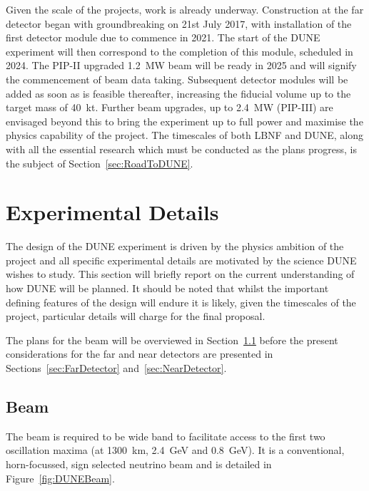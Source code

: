 Given the scale of the projects, work is already underway.  Construction at the far detector began with groundbreaking on 21st July 2017, with installation of the first detector module due to commence in 2021.  The start of the DUNE experiment will then correspond to the completion of this module, scheduled in 2024.  The PIP-II upgraded 1.2~MW beam will be ready in 2025 and will signify the commencement of beam data taking.  Subsequent detector modules will be added as soon as is feasible thereafter, increasing the fiducial volume up to the target mass of 40~kt.  Further beam upgrades, up to 2.4~MW (PIP-III) are envisaged beyond this to bring the experiment up to full power and maximise the physics capability of the project.  The timescales of both LBNF and DUNE, along with all the essential research which must be conducted as the plans progress, is the subject of Section~\ref{sec:RoadToDUNE}.

\section{Experimental Details}\label{sec:DUNEExperiment}

The design of the DUNE experiment is driven by the physics ambition of the project and all specific experimental details are motivated by the science DUNE wishes to study.  This section will briefly report on the current understanding of how DUNE will be planned.  It should be noted that whilst the important defining features of the design will endure it is likely, given the timescales of the project, particular details will charge for the final proposal.

The plans for the beam will be overviewed in Section~\ref{sec:DUNEBeam} before the present considerations for the far and near detectors are presented in Sections~\ref{sec:FarDetector} and~\ref{sec:NearDetector}.

\subsection{Beam}\label{sec:DUNEBeam}

The beam is required to be wide band to facilitate access to the first two oscillation maxima (at 1300~km, 2.4~GeV and 0.8~GeV).  It is a conventional, horn-focussed, sign selected neutrino beam and is detailed in Figure~\ref{fig:DUNEBeam}.

